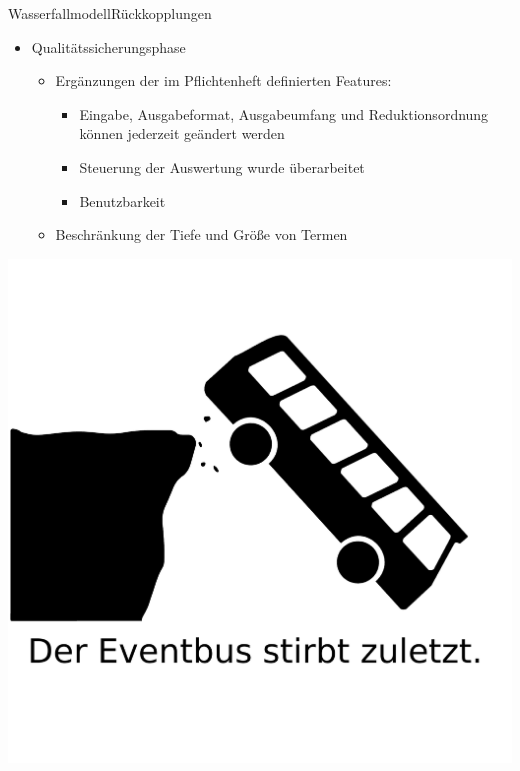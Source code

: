 \documentclass[10pt]{beamer}
\begin{document}
\begin{frame}{Wasserfallmodell}{Rückkopplungen}
\begin{itemize}
	\item Qualitätssicherungsphase
	\begin{itemize}
		\item Ergänzungen der im Pflichtenheft definierten Features:
		\begin{itemize}
			\item Eingabe, Ausgabeformat, Ausgabeumfang und Reduktionsordnung können jederzeit geändert werden
			\item Steuerung der Auswertung wurde überarbeitet
			\item Benutzbarkeit
		\end{itemize}
		\item Beschränkung der Tiefe und Größe von Termen
	\end{itemize}
\end{itemize}
\end{frame}

{\1
\begin{frame}
  \includegraphics[width = \textwidth]{img/eventbus}
\end{frame}}
\end{document}

